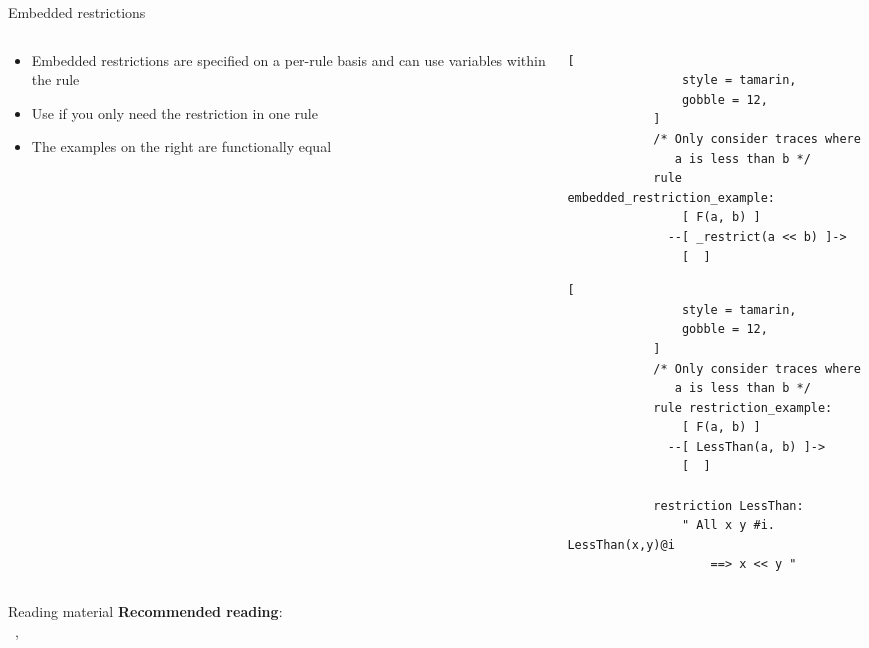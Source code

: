 \documentclass[11pt,aspectratio=169]{beamer}
\begin{document}
\begin{frame}[fragile]{Embedded restrictions}
    \begin{columns}
        \begin{column}{.5\textwidth}
            \begin{itemize}
                \item Embedded restrictions are specified on a per-rule basis 
                      and can use variables within the rule
                \item Use if you only need the restriction in one rule
                \item The examples on the right are functionally equal
            \end{itemize}
        \end{column}
        \begin{column}{.5\textwidth}
            \begin{lstlisting}[
                style = tamarin,
                gobble = 12,
            ]
            /* Only consider traces where
               a is less than b */
            rule embedded_restriction_example:
                [ F(a, b) ]
              --[ _restrict(a << b) ]->
                [  ]
            \end{lstlisting}
            \vspace*{1cm}
            \begin{lstlisting}[
                style = tamarin,
                gobble = 12,
            ]
            /* Only consider traces where
               a is less than b */
            rule restriction_example:
                [ F(a, b) ]
              --[ LessThan(a, b) ]->
                [  ]

            restriction LessThan:
                " All x y #i. LessThan(x,y)@i
                    ==> x << y "
                \end{lstlisting}
        \end{column}
    \end{columns}
    \vsep
\end{frame}

\begin{frame}[fragile]{Reading material}
    \textbf{Recommended reading}:\\\;
        ~\cite[Ch. 5.9--5.10, 9--10]{tamarin-book},
        ~\cite[Ch. 8.3]{meier2013thesis}
    \begin{refsection}
        \nocite{tamarin-book,meier2013thesis}
        \printbibliography[heading=none]
    \end{refsection}
\end{frame}
\end{document}
